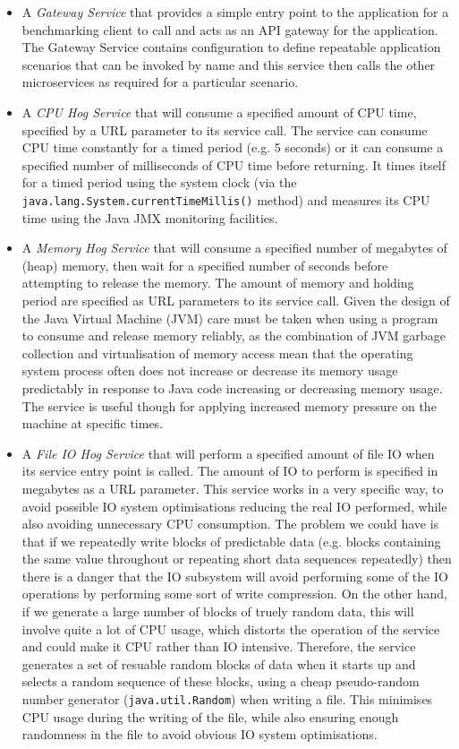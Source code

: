 \begin{itemize}
	\item A \emph{Gateway Service} that provides a simple entry point to the application for a benchmarking client to call and acts as an API gateway for the application.  The Gateway Service contains configuration to define repeatable application scenarios that can be invoked by name and this service then calls the other microservices as required for a particular scenario.
	\item A \emph{CPU Hog Service} that will consume a specified amount of CPU time, specified by a URL parameter to its service call.  The service can consume CPU time constantly for a timed period (e.g. 5 seconds) or it can consume a specified number of milliseconds of CPU time before returning.  It times itself for a timed period using the system clock (via the \texttt{java.lang.System.currentTimeMillis()} method) and measures its CPU time using the Java JMX monitoring facilities.
	\item A \emph{Memory Hog Service} that will consume a specified number of megabytes of (heap) memory, then wait for a specified number of seconds before attempting to release the memory.  The amount of memory and holding period are specified as URL parameters to its service call.  Given the design of the Java Virtual Machine (JVM) care must be taken when using a program to consume and release memory reliably, as the combination of JVM garbage collection and virtualisation of memory access mean that the operating system process often does not increase or decrease its memory usage predictably in response to Java code increasing or decreasing memory usage.  The service is useful though for applying increased memory pressure on the machine at specific times.
	\item A \emph{File IO Hog Service} that will perform a specified amount of file IO when its service entry point is called.  The amount of IO to perform is specified in megabytes as a URL parameter.  This service works in a very specific way, to avoid possible IO system optimisations reducing the real IO performed, while also avoiding unnecessary CPU consumption.  The problem we could have is that if we repeatedly write blocks of predictable data (e.g. blocks containing the same value throughout or repeating short data sequences repeatedly) then there is a danger that the IO subsystem will avoid performing some of the IO operations by performing some sort of write compression.  On the other hand, if we generate a large number of blocks of truely random data, this will involve quite a lot of CPU usage, which distorts the operation of the service and could make it CPU rather than IO intensive.  Therefore, the service generates a set of resuable random blocks of data when it starts up and selects a random sequence of these blocks, using a cheap pseudo-random number generator (\texttt{java.util.Random}) when writing a file.  This minimises CPU usage during the writing of the file, while also ensuring enough randomness in the file to avoid obvious IO system optimisations.
 \end{itemize}

